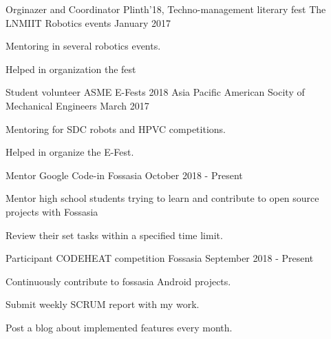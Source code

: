 \begin{cventries}
\cventry
    {Orginazer and Coordinator}
    {Plinth'18, Techno-management literary fest The LNMIIT}
    {Robotics events}
    {January 2017}
    {
      \begin{cvitems}
        \item {Mentoring in several robotics events.}
        \item {Helped in organization the fest}
      \end{cvitems}
    }
    \cventry
    {Student volunteer}
    {ASME E-Fests 2018 Asia Pacific}
    {American Socity of Mechanical Engineers}
    {March 2017}
    {
      \begin{cvitems}
        \item {Mentoring for SDC robots and HPVC competitions.}
        \item {Helped in organize the E-Fest.}
      \end{cvitems}
    }
    \cventry
    {Mentor}
    {Google Code-in}
    {Fossasia}
    {October 2018 - Present}
    {
      \begin{cvitems}
        \item {Mentor high school students trying to learn and contribute to open source projects with Fossasia}
        \item {Review their set tasks within a specified time limit.}
      \end{cvitems}
    }
  \cventry
    {Participant}
    {CODEHEAT competition}
    {Fossasia}
    {September 2018 - Present}
    {
      \begin{cvitems}
        \item {Continuously contribute to fossasia Android projects.}
        \item {Submit weekly SCRUM report with my work.}
        \item {Post a blog about implemented features every month.}
      \end{cvitems}
    }
\end{cventries}
